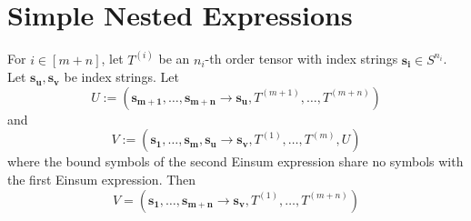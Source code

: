 \section{Simple Nested Expressions}

\begin{theorem}
    \label{thm:nested_einsum:1}

    For $i \in [m + n]$, let $T^{(i)}$ be an $n_i$-th order tensor with index strings $\bm{s_i} \in S^{n_i}$.
    Let $\bm{s_u}, \bm{s_v}$ be index strings.
    Let
    $$U := (\bm{s_{m + 1}},\dots,\bm{s_{m + n}} \rightarrow \bm{s_u}, T^{(m + 1)},\dots,T^{(m + n)})$$
    and
    $$V := (\bm{s_1},\dots,\bm{s_m}, \bm{s_u} \rightarrow \bm{s_v}, T^{(1)},\dots,T^{(m)}, U)$$
    where the bound symbols of the second Einsum expression share no symbols with the first Einsum expression.
    Then
    $$V = (\bm{s_1}, \dots, \bm{s_{m + n}} \rightarrow \bm{s_v}, T^{(1)}, \dots, T^{(m + n)})$$
\end{theorem}

